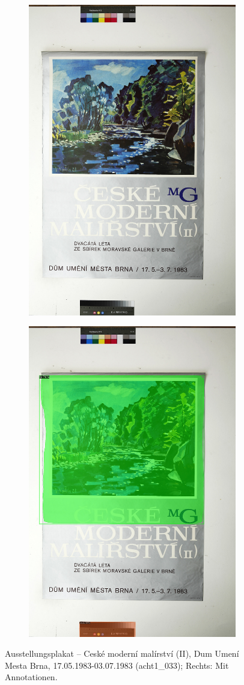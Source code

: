 \documentclass[a4paper,12pt,ngerman]{article}
\begin{document}
\newpage
\begin{landscape}
\begin{figure}[ht]
	\begin{subfigure}[b]{0.5\linewidth}
	\centering
	\includegraphics[height=\linewidth]{Abbildung_50_(acht1_033)}
	\end{subfigure}
	\begin{subfigure}[b]{0.5\linewidth}
	\centering
	\includegraphics[height=\linewidth]{Abbildung_50_(acht1_033)_with_detections}
	\end{subfigure}
	\caption{Ausstellungsplakat – Ceské moderní malírství (II), Dum Umení Mesta Brna, 17.05.1983-03.07.1983 (acht1\_033); Rechts: Mit Annotationen.}
\end{figure}
\end{landscape}
\end{document}
